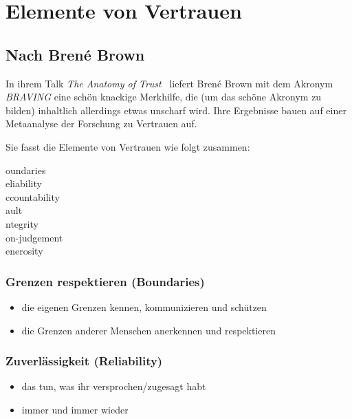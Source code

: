 \section{Elemente von Vertrauen}
\label{vertrauen-elemente}

\subsection{Nach Brené Brown}

In ihrem Talk \emph{The Anatomy of Trust}~\cite{anatomy-of-trust} liefert Brené Brown mit dem Akronym \emph{BRAVING} eine schön knackige Merkhilfe, die (um das schöne Akronym zu bilden) inhaltlich allerdings etwas unscharf wird. Ihre Ergebnisse bauen auf einer Metaanalyse der Forschung zu Vertrauen auf.

Sie fasst die Elemente von Vertrauen wie folgt zusammen:

oundaries \\
eliability \\
ccountability \\
ault \\
ntegrity \\
on-judgement \\
enerosity

\subsubsection{Grenzen respektieren (Boundaries)}

\begin{itemize}
    \item die eigenen Grenzen kennen, kommunizieren und schützen
    \item die Grenzen anderer Menschen anerkennen und respektieren
\end{itemize}

\subsubsection{Zuverlässigkeit (Reliability)}

\begin{itemize}
    \item das tun, was ihr versprochen/zugesagt habt
    \item immer und immer wieder
\end{itemize}

